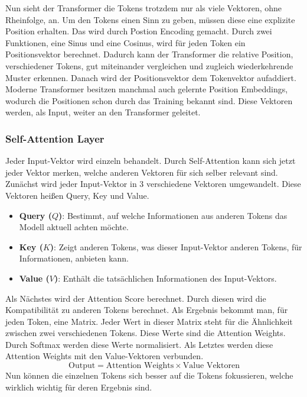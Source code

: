 Nun sieht der Transformer die Tokens trotzdem nur als viele Vektoren, ohne Rheinfolge, an.
Um den Tokens einen Sinn zu geben, müssen diese eine explizite Position erhalten.
Das wird durch Postion Encoding gemacht.
Durch zwei Funktionen, eine Sinus und eine Cosinus, wird für jeden Token ein Positionsvektor berechnet.
Dadurch kann der Transformer die relative Position, verschiedener Tokens,
gut miteinander vergleichen und zugleich wiederkehrende Muster erkennen.
Danach wird der Positionsvektor dem Tokenvektor aufaddiert.
Moderne Transformer besitzen manchmal auch gelernte Position Embeddings,
wodurch die Positionen schon durch das Training bekannt sind.
Diese Vektoren werden, als Input, weiter an den Transformer geleitet.

\subsubsection{Self-Attention Layer}
Jeder Input-Vektor wird einzeln behandelt.
Durch Self-Attention kann sich jetzt jeder Vektor merken, welche anderen Vektoren für sich selber relevant sind.
Zunächst wird jeder Input-Vektor in 3 verschiedene Vektoren umgewandelt.
Diese Vektoren heißen Query, Key und Value.
\begin{itemize}
  \item \textbf{Query ($Q$)}: Bestimmt, auf welche Informationen aus anderen Tokens das Modell aktuell achten möchte.
  \item \textbf{Key ($K$)}: Zeigt anderen Tokens, was dieser Input-Vektor anderen Tokens, für Informationen, anbieten kann.
  \item \textbf{Value ($V$)}: Enthält die tatsächlichen Informationen des Input-Vektors.
\end{itemize}
Als Nächstes wird der Attention Score berechnet.
Durch diesen wird die Kompatibilität zu anderen Tokens berechnet.
Als Ergebnis bekommt man, für jeden Token, eine Matrix.
Jeder Wert in dieser Matrix steht für die Ähnlichkeit zwischen zwei verschiedenen Tokens.
Diese Werte sind die Attention Weights.
Durch Softmax werden diese Werte normalisiert.
Als Letztes werden diese Attention Weights mit den Value-Vektoren verbunden.
\[
\text{Output} = \text{Attention Weights} \times \text{Value Vektoren}
\]
Nun können die einzelnen Tokens sich besser auf die Tokens fokussieren, welche wirklich wichtig für deren Ergebnis sind.

